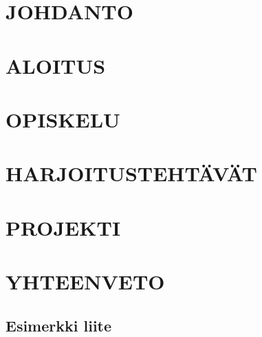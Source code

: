 \chapter{JOHDANTO}
\label{ch:johdanto}


\chapter{ALOITUS}
\label{ch:aloitus}


\chapter{OPISKELU}
\label{ch:opiskelu}


\chapter{HARJOITUSTEHTÄVÄT}
\label{ch:harjoitustehtavat}


\chapter{PROJEKTI}
\label{ch:projekti}


\chapter{YHTEENVETO}
\label{ch:yhteenveto}



\printbibliography[heading=bibintoc]



\begin{appendices}

\chapter{Esimerkki liite}
\label{ch:example-appendix}


\end{appendices}


